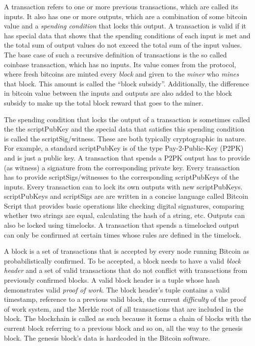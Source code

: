A  transaction refers to one or more previous transactions, which are called its inputs. It also has one or more outputs, which are a combination of some bitcoin value and a \textit{spending condition} that locks this output. A transaction is valid if it has special data that shows that the spending conditions of each input is met and the total sum of output values do not exceed the total sum of the input values. The base case of such a recursive definition of transactions is the so called coinbase transaction, which has no inputs. Its value comes from the protocol, where fresh bitcoins are minted every \textit{block} and given to the \textit{miner} who \textit{mines} that block. This amount is called the ``block subsidy''. Additionally, the difference in bitcoin value between the inputs and outputs are also added to the block subsidy to make up the total block reward that goes to the miner.

The spending condition that locks the output of a transaction is sometimes called the the scriptPubKey and the special data that satisfies this spending condition is called the scriptSig/witness. These are both typically cryptographic in nature. For example, a standard scriptPubKey is of the type Pay-2-Public-Key (P2PK) and is just a public key. A transaction that spends a P2PK output has to provide (as witness) a signature from the corresponding private key. Every transaction has to provide scriptSigs/witnesses to the corresponding scriptPubKeys of the inputs. Every transaction can to lock its own outputs with new scriptPubKeys. scriptPubKeys and scriptSigs are are written in a concise language called Bitcoin Script that provides basic operations like checking digital signatures, comparing whether two strings are equal, calculating the hash of a string, etc. Outputs can also be locked using timelocks. A transaction that spends a timelocked output can only be confirmed at certain times whose rules are defined in the timelock. 

A block is a set of transactions that is accepted by every node running Bitcoin as probabilistically confirmed. To be accepted, a block needs to have a valid \textit{block header} and a set of valid transactions that do not conflict with transactions from previously confirmed blocks. A valid block header is a tuple whose hash demonstrates valid \textit{proof of work}. The block header's tuple contains a valid timestamp, reference to a previous valid block, the current \textit{difficulty} of the proof of work system, and the Merkle root of all transactions that are included in the block. The blockchain is called as such because it forms a chain of blocks with the current block referring to a previous block and so on, all the way to the genesis block. The genesis block's data is hardcoded in the Bitcoin software. 

